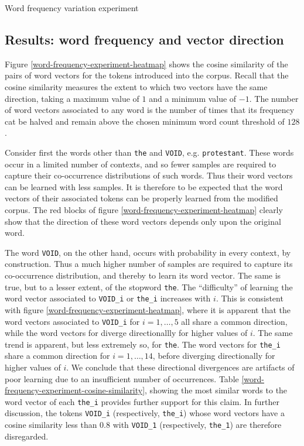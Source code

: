 \documentclass{article} %
\newcommand{\word}[1]{\texttt{#1}}
\begin{document}
\begin{section}{Word frequency variation experiment}
\subsection{Results: word frequency and vector direction}\label{WFVE-direction}
Figure \ref{word-frequency-experiment-heatmap} shows the cosine similarity of the pairs of word vectors for the tokens introduced into the corpus.
Recall that the cosine similarity measures the extent to which two vectors have the same direction, taking a maximum value of $1$ and a minimum value of $-1$.
The number of word vectors associated to any word is the number of times that its frequency cat be halved and remain above the chosen minimum word count threshold of $128$.

Consider first the words other than \word{the} and \word{VOID}, e.g. \word{protestant}.
These words occur in a limited number of contexts, and so fewer samples are required to capture their co-occurrence distributions of such words.
Thus their word vectors can be learned with less samples.
It is therefore to be expected that the word vectors of their associated tokens can be properly learned from the modified corpus.
The red blocks of figure \ref{word-frequency-experiment-heatmap} clearly show that the direction of these word vectors depends only upon the original word.

The word \word{VOID}, on the other hand, occurs with probability in every context, by construction.
Thus a much higher number of samples are required to capture its co-occurrence distribution, and thereby to learn its word vector.
The same is true, but to a lesser extent, of the stopword \word{the}.
The ``difficulty'' of learning the word vector associated to \word{VOID\_i} or \word{the\_i} increases with $i$.
This is consistent with figure \ref{word-frequency-experiment-heatmap}, where it is apparent that the word vectors associated to \word{VOID\_i} for $i = 1, \dots, 5$ all share a common direction, while the word vectors for diverge directionallly for higher values of $i$.
The same trend is apparent, but less extremely so, for \word{the}.
The word vectors for \word{the\_i} share a common direction for $i = 1, \dots, 14$, before diverging directionally for higher values of $i$.
We conclude that these directional divergences are artifacts of poor learning due to an insufficient number of occurrences.
Table \ref{word-frequency-experiment-cosine-similarity}, showing the most similar words to the word vector of each \word{the\_i} provides further support for this claim.
In further discussion, the tokens \word{VOID\_i} (respectively, \word{the\_i}) whose word vectors have a cosine similarity less than $0.8$ with \word{VOID\_1} (respectively, \word{the\_1}) are therefore disregarded.


\end{section}
\end{document}
